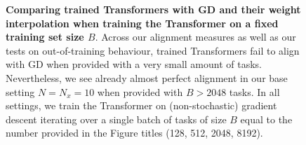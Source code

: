 \documentclass{article}
\theoremstyle{plain}
\theoremstyle{definition}
\theoremstyle{remark}
\begin{document}
\begin{figure}
\begin{center}
\begin{minipage}{.24\textwidth}
\begin{center}
  \end{center}
  \vspace{-10pt}
\end{minipage}
\end{center}
\vspace{-3pt}
  \caption{ \textbf{Comparing trained Transformers with GD and their weight interpolation when training the Transformer on a fixed training set size $B$}. Across our alignment measures as well as our tests on out-of-training behaviour, trained Transformers fail to align with GD when provided with a very small amount of tasks. Nevertheless, we see already almost perfect alignment in our base setting $N=N_x=10$ when provided with $B>2048$ tasks. In all settings, we train the Transformer on (non-stochastic) gradient descent iterating over a single batch of tasks of size $B$ equal to the number provided in the Figure titles (128, 512, 2048, 8192).}
  \label{fig:cycling}
  \vspace{-10pt}
\end{figure}
\end{document}

